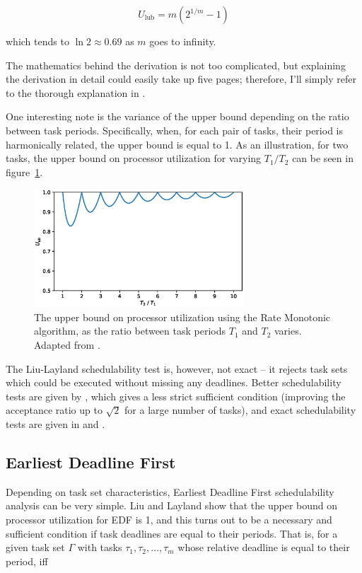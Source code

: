 \begin{equation}
U_{\text{lub}} = m(2^{1/m} - 1)
\end{equation}

\noindent which tends to $\ln 2 \approx 0.69$ as $m$ goes to infinity.

The mathematics behind the derivation is not too complicated, but explaining the derivation in detail could easily take up five pages; therefore, I'll simply refer to the thorough explanation in \textcite[pp. 90-97]{buttazzo2011hard}.

One interesting note is the variance of the upper bound depending on the ratio between task periods. Specifically, when, for each pair of tasks, their period is harmonically related\cite[\S 4]{Buttazzo2005}, the upper bound is equal to 1. As an illustration, for two tasks, the upper bound on processor utilization for varying $T_1 / T_2$ can be seen in figure~\ref{fig:ubk}.

\begin{figure}[htpb]
    \centering
    \includegraphics[width=0.7\textwidth]{figures/ub_rm_2tasks.eps}
    \caption{The upper bound on processor utilization using the Rate Monotonic algorithm, as the ratio between task periods $T_1$ and $T_2$ varies. Adapted from \textcite{buttazzo2011hard}.}
    \label{fig:ubk}
\end{figure}

The Liu-Layland schedulability test is, however, not exact -- it rejects task sets which could be executed without missing any deadlines. Better schedulability tests are given by \textcite{Bini2003}, which gives a less strict sufficient condition (improving the acceptance ratio up to $\sqrt{2}$ for a large number of tasks), and exact schedulability tests are given in \textcite{Lehoczky1989} and \textcite{Audsley1993}.

\subsection{Earliest Deadline First}
Depending on task set characteristics, Earliest Deadline First schedulability analysis can be very simple. Liu and Layland show that the upper bound on processor utilization for EDF is 1, and this turns out to be a necessary and sufficient condition if task deadlines are equal to their periods. That is, for a given task set $\Gamma$ with tasks $\tau_1, \tau_2, \ldots, \tau_m$ whose relative deadline is equal to their period, iff

